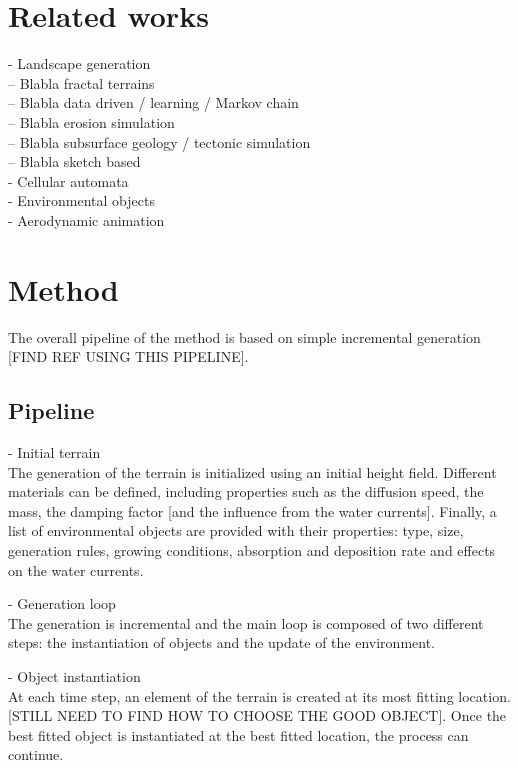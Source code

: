 \documentclass{egpubl}
\begin{document}
\section{Related works}
- Landscape generation \cite{Galin2019} \\
-- Blabla fractal terrains \cite{Musgrave1989} \\
-- Blabla data driven \cite{Kapp2020} / learning \cite{Brosz2007} / Markov chain \\
-- Blabla erosion simulation \cite{Cordonnier2023, Schott2023a, Paris2019b, ...} \\
-- Blabla subsurface geology \cite{Patel2021} / tectonic simulation \cite{Cortial2019, Michel2016} \\
-- Blabla sketch based \cite{Guerin2017, Talgorn2018} \\

- Cellular automata \\

- Environmental objects \cite{Grosbellet2016, Guerin2016a} \\ 

- Aerodynamic animation \cite{Wejchert1991} \\


\section{Method}
The overall pipeline of the method is based on simple incremental generation [FIND REF USING THIS PIPELINE].

\subsection{Pipeline}
- Initial terrain \\
The generation of the terrain is initialized using an initial height field. Different materials can be defined, including properties such as the diffusion speed, the mass, the damping factor [and the influence from the water currents]. Finally, a list of environmental objects are provided with their properties: type, size, generation rules, growing conditions, absorption and deposition rate and effects on the water currents.


- Generation loop \\
The generation is incremental and the main loop is composed of two different steps: the instantiation of objects and the update of the environment.

- Object instantiation \\
At each time step, an element of the terrain is created at its most fitting location. [STILL NEED TO FIND HOW TO CHOOSE THE GOOD OBJECT]. Once the best fitted object is instantiated at the best fitted location, the process can continue.
	
\end{document}
